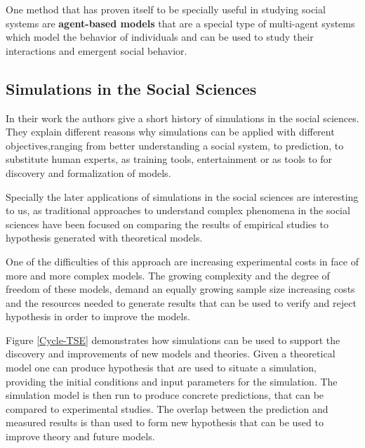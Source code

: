 \bb

One method that has proven itself to be specially useful in studying social systems are
\textbf{agent-based models}\cite{Jackson2017} that are a special type of multi-agent systems
which model the behavior of individuals and can be used to study their interactions
and emergent social behavior.

\subsection{Simulations in the Social Sciences}
In their work \cite{gilbert2005simulation} the authors give a short history of
simulations in the social sciences. They explain different reasons why simulations
can be applied with different objectives,ranging from better understanding a social
system, to prediction, to substitute human experts, as training tools, entertainment
or as tools to for discovery and formalization of models.

\bb

Specially the later applications of simulations in the social sciences are interesting
to us, as traditional approaches to understand complex phenomena in the social sciences
have been focused on comparing the results of empirical studies to hypothesis
generated with theoretical models.

One of the difficulties of this approach are increasing experimental costs
in face of more and more complex models. The growing complexity and the degree of
freedom of these models, demand an equally growing sample size increasing costs and the
resources needed to generate results that can be used to verify and reject hypothesis
in order to improve the models.

\bb

Figure \ref{Cycle-TSE} demonstrates how simulations can be used to support
the discovery and improvements of new models and theories. Given a theoretical model
one can produce hypothesis that are used to situate a simulation, providing the initial
conditions and input parameters for the simulation. The simulation model is then
run to produce concrete predictions, that can be compared to experimental studies.
The overlap between the prediction and measured results is than used to form new
hypothesis that can be used to improve theory and future models.


\begin{figure}[H]
\end{figure}

